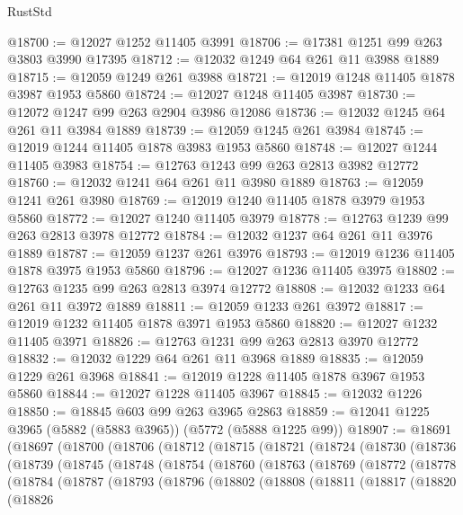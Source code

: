\begin{lexlean}{RustStd}
\begin{coremodule}
@18700 := @12027 @1252 @11405 @3991
@18706 := @17381 @1251 @99 @263 @3803 @3990 @17395
@18712 := @12032 @1249 @64 @261 @11 @3988 @1889
@18715 := @12059 @1249 @261 @3988
@18721 := @12019 @1248 @11405 @1878 @3987 @1953 @5860
@18724 := @12027 @1248 @11405 @3987
@18730 := @12072 @1247 @99 @263 @2904 @3986 @12086
@18736 := @12032 @1245 @64 @261 @11 @3984 @1889
@18739 := @12059 @1245 @261 @3984
@18745 := @12019 @1244 @11405 @1878 @3983 @1953 @5860
@18748 := @12027 @1244 @11405 @3983
@18754 := @12763 @1243 @99 @263 @2813 @3982 @12772
@18760 := @12032 @1241 @64 @261 @11 @3980 @1889
@18763 := @12059 @1241 @261 @3980
@18769 := @12019 @1240 @11405 @1878 @3979 @1953 @5860
@18772 := @12027 @1240 @11405 @3979
@18778 := @12763 @1239 @99 @263 @2813 @3978 @12772
@18784 := @12032 @1237 @64 @261 @11 @3976 @1889
@18787 := @12059 @1237 @261 @3976
@18793 := @12019 @1236 @11405 @1878 @3975 @1953 @5860
@18796 := @12027 @1236 @11405 @3975
@18802 := @12763 @1235 @99 @263 @2813 @3974 @12772
@18808 := @12032 @1233 @64 @261 @11 @3972 @1889
@18811 := @12059 @1233 @261 @3972
@18817 := @12019 @1232 @11405 @1878 @3971 @1953 @5860
@18820 := @12027 @1232 @11405 @3971
@18826 := @12763 @1231 @99 @263 @2813 @3970 @12772
@18832 := @12032 @1229 @64 @261 @11 @3968 @1889
@18835 := @12059 @1229 @261 @3968
@18841 := @12019 @1228 @11405 @1878 @3967 @1953 @5860
@18844 := @12027 @1228 @11405 @3967
@18845 := @12032 @1226
@18850 := @18845 @603 @99 @263 @3965 @2863
@18859 := @12041 @1225 @3965 (@5882 (@5883 @3965)) (@5772 (@5888 @1225 @99))
@18907 := @18691
    (@18697
      (@18700
        (@18706
          (@18712
            (@18715
              (@18721
                (@18724
                  (@18730
                    (@18736
                      (@18739
                        (@18745
                          (@18748
                            (@18754
                              (@18760
                                (@18763
                                  (@18769
                                    (@18772
                                      (@18778
                                        (@18784
                                          (@18787
                                            (@18793
                                              (@18796
                                                (@18802
                                                  (@18808
                                                    (@18811
                                                      (@18817
                                                        (@18820
                                                          (@18826

\end{coremodule}
\end{lexlean}
